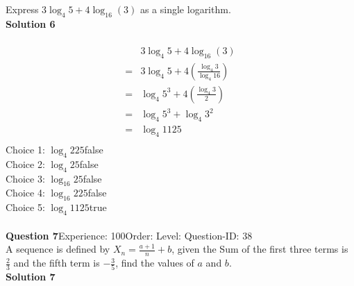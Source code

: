 \documentclass{article}
\begin{document}
Express $3\log_{4}5+4\log_{16}(3)$ as a single logarithm.\\[4pt]
\noindent\textbf{Solution 6}\\[2pt]
\\[-35pt]\begin{align*}
&3\log_{4}5+4\log_{16}(3)\\[2pt]
=&3\log_{4}5+4\left(\displaystyle\frac{\log_{4}3}{\log_{4}16}\right)\\[2pt]
=&\log_{4}5^3+4\left(\displaystyle\frac{\log_{4}3}{2}\right)\\[2pt]
=&\log_{4}5^3+\log_{4}3^2\\[2pt]
=&\log_{4}1125\\[-120pt]
\end{align*}
Choice 1: \hspace{20pt}$\log_{4}225$\hspace{20pt}false\\
Choice 2: \hspace{20pt}$\log_{4}25$\hspace{20pt}false\\
Choice 3: \hspace{20pt}$\log_{16}25$\hspace{20pt}false\\
Choice 4: \hspace{20pt}$\log_{16}225$\hspace{20pt}false\\
Choice 5: \hspace{20pt}$\log_{4}1125$\hspace{20pt}true\\
\\[4pt]
\noindent\textbf{Question 7}\hspace{20pt}Experience: 100\hspace{20pt}Order: \hspace{20pt}Level: \hspace{20pt}Question-ID: 38\\[2pt]
A sequence is defined by $X_n=\displaystyle\frac{a+1}{n}+b$, given the Sum of the first three terms is $\displaystyle\frac{2}{3}$ and the fifth term is $-\displaystyle\frac{3}{5}$, find the values of $a$ and $b$.\\[4pt]
\noindent\textbf{Solution 7}\\[2pt]
\end{document}
